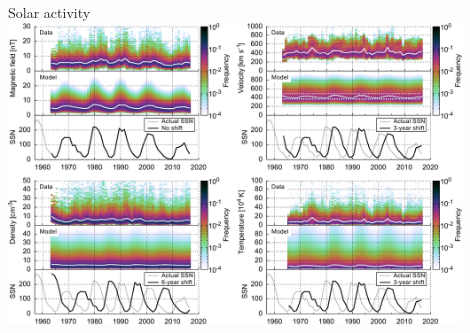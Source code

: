 \begin{frame}[plain,c]{Solar activity}{}
	\centering
	\includegraphics[width=0.9\textwidth]{../figures_paper/OMNI_yearly_BVdblNTSSN_fit_e_plot.pdf}
\end{frame}
